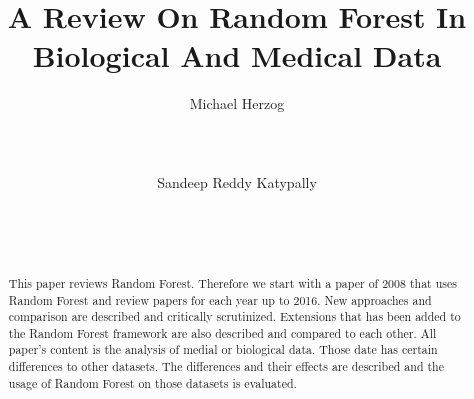 \documentclass{sig-alternate-05-2015}
\begin{document}






%
\title{A Review On Random Forest In Biological And Medical Data}

\author{
\alignauthor
Michael Herzog\\
       \\
       \\
       \\
\alignauthor
Sandeep Reddy Katypally\\
       \\
       \\
       \\
}

\maketitle
\begin{abstract}
This paper reviews Random Forest. Therefore we start with a paper of 2008 that uses Random Forest and review papers for each year up to 2016. New approaches and comparison are described and critically scrutinized. Extensions that has been added to the Random Forest framework are also described and compared to each other. All paper's content is the analysis of medial or biological data. Those date has certain differences to other datasets. The differences and their effects are described and the usage of Random Forest on those datasets is evaluated.
\end{abstract}
\end{document}
